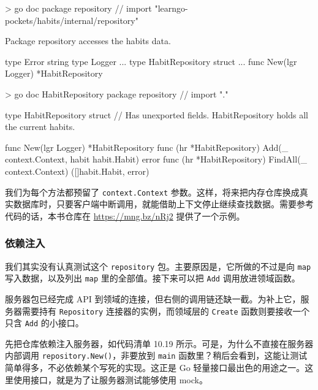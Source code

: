 \begin{shellcode}[]
> go doc
package repository // import "learngo-pockets/habits/internal/repository"

Package repository accesses the habits data.

type Error string
type Logger {...}
type HabitRepository struct{ ... }
    func New(lgr Logger) *HabitRepository

> go doc HabitRepository
package repository // import "."

type HabitRepository struct {
        // Has unexported fields.
}
    HabitRepository holds all the current habits.

func New(lgr Logger) *HabitRepository
func (hr *HabitRepository) Add(_ context.Context, habit habit.Habit) error
func (hr *HabitRepository) FindAll(_ context.Context) ([]habit.Habit, error)
\end{shellcode}

我们为每个方法都预留了 \texttt{context.Context} 参数。这样，将来把内存仓库换成真实数据库时，只要客户端中断调用，就能借助上下文停止继续查找数据。需要参考代码的话，本书仓库在 \url{https://mng.bz/nRj2} 提供了一个示例。

\subsubsection{依赖注入}

我们其实没有认真测试这个 \texttt{repository} 包。主要原因是，它所做的不过是向 \texttt{map} 写入数据，以及列出 \texttt{map} 里的全部值。接下来可以把 \texttt{Add} 调用放进领域函数。

服务器包已经完成 API 到领域的连接，但右侧的调用链还缺一截。为补上它，服务器需要持有 \texttt{Repository} 连接器的实例，而领域层的 \texttt{Create} 函数则要接收一个只含 \texttt{Add} 的小接口。

先把仓库依赖注入服务器，如代码清单 10.19 所示。可是，为什么不直接在服务器内部调用 \texttt{repository.New()}，非要放到 \texttt{main} 函数里？稍后会看到，这能让测试简单得多，不必依赖某个写死的实现。这正是 Go 轻量接口最出色的用途之一。这里使用接口，就是为了让服务器测试能够使用 mock。


